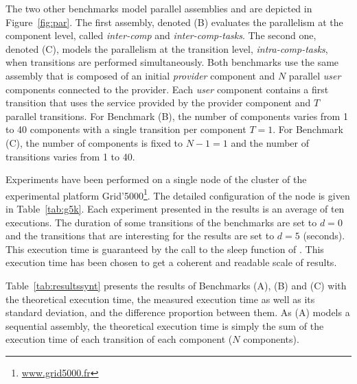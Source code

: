 The two other benchmarks model \mad parallel assemblies and are
depicted in Figure~\ref{fig:par}. The first assembly, denoted (B)
evaluates the parallelism at the component level, called
\emph{inter-comp} and \emph{inter-comp-tasks}. The second one, denoted
(C), models the parallelism at the transition level, \ie
\emph{intra-comp-tasks}, when transitions are performed
simultaneously.
%
Both benchmarks use the same assembly that is composed of an initial
\emph{provider} component and $N$ parallel \emph{user} components
connected to the provider. Each \emph{user} component contains a first
transition that uses the service provided by the provider component
and $T$ parallel transitions. For Benchmark (B), the number of
components varies from 1 to 40 components with a single transition per
component $T=1$. For Benchmark (C), the number of components is fixed
to $N-1=1$ and the number of transitions varies from 1 to 40.

Experiments have been performed on a single node of the \ecotype
cluster of the experimental platform
Grid'5000\footnote{\url{www.grid5000.fr}}. The detailed configuration
of the node is given in Table~\ref{tab:g5k}. Each experiment presented
in the results is an average of ten executions. The duration of some
transitions of the benchmarks are set to $d=0$ and the transitions
that are interesting for the results are set to $d=5$ (seconds). This
execution time is guaranteed by the call to the sleep function of
\python. This execution time has been chosen to get a coherent and
readable scale of results.


Table~\ref{tab:resultssynt} presents the results of Benchmarks (A), (B) and (C) with the theoretical execution time, the measured execution time as well as its standard deviation, and the difference proportion between them. As (A) models a sequential assembly, the theoretical execution time is simply the sum of the execution time of each transition of each component ($N$ components).
%
 
